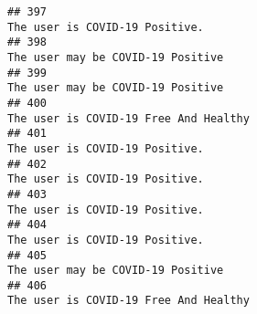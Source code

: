 \documentclass[
]{article}
\begin{document}
\begin{verbatim}
## 397                                                                                                                                                                                                                                     The user is COVID-19 Positive.
## 398                                                                                                                                                                                                                                  The user may be COVID-19 Positive
## 399                                                                                                                                                                                                                                  The user may be COVID-19 Positive
## 400                                                                                                                                                                                                                              The user is COVID-19 Free And Healthy
## 401                                                                                                                                                                                                                                     The user is COVID-19 Positive.
## 402                                                                                                                                                                                                                                     The user is COVID-19 Positive.
## 403                                                                                                                                                                                                                                     The user is COVID-19 Positive.
## 404                                                                                                                                                                                                                                     The user is COVID-19 Positive.
## 405                                                                                                                                                                                                                                  The user may be COVID-19 Positive
## 406                                                                                                                                                                                                                              The user is COVID-19 Free And Healthy

\end{verbatim}
\end{document}
